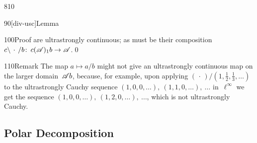 \begin{parsec}{810}
\begin{point}{90}[div-usc]{Lemma}
\begin{point}{100}{Proof}
are ultrastrongly continuous;
as must be their composition $c\backslash\,\cdot\,/b\colon\,
c(\mathscr{A})_1b\to\mathscr{A}$.\qed
\end{point}
\begin{point}{110}{Remark}%
The map $a\mapsto a/b$ might not give
an ultrastrongly
continuous map on the larger domain~$\mathscr{A} b$,
because, for example, 
upon applying $(\,\cdot\,)/(1,\frac{1}{2},\frac{1}{3},\dotsc)$
to the ultrastrongly Cauchy 
sequence  $(1,0,0,\dotsc),\ (1,1,0,\dotsc),\ \dotsc$
in~$\ell^\infty$
we get the 
sequence $(1,0,0,\dotsc),\ (1,2,0,\dotsc),\ \dotsc$,
which is not ultrastrongly Cauchy.
\end{point}
\end{point}
\end{parsec}
\subsection{Polar Decomposition}

